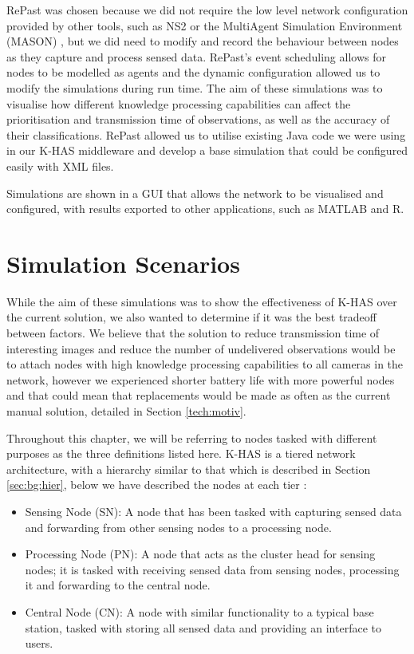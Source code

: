 RePast was chosen because we did not require the low level network configuration provided by other tools, such as NS2 \cite{mccanne1997network} or the MultiAgent Simulation Environment (MASON) \cite{mason}, but we did need to modify and record the behaviour between nodes as they capture and process sensed data. RePast's event scheduling allows for nodes to be modelled as agents and the dynamic configuration allowed us to modify the simulations during run time. The aim of these simulations was to visualise how different knowledge processing capabilities can affect the prioritisation and transmission time of observations, as well as the accuracy of their classifications. RePast allowed us to utilise existing Java code we were using in our K-HAS middleware and develop a base simulation that could be configured easily with XML files.

Simulations are shown in a GUI that allows the network to be visualised and configured, with results exported to other applications, such as MATLAB and R.

\section{Simulation Scenarios}\label{sim:scen}
While the aim of these simulations was to show the effectiveness of K-HAS over the current solution, we also wanted to determine if it was the best tradeoff between factors. We believe that the solution to reduce transmission time of interesting images and reduce the number of undelivered observations would be to attach nodes with high knowledge processing capabilities to all cameras in the network, however we experienced shorter battery life with more powerful nodes and that could mean that replacements would be made as often as the current manual solution, detailed in Section \ref{tech:motiv}.

Throughout this chapter, we will be referring to nodes tasked with different purposes as the three definitions listed here. K-HAS is a tiered network architecture, with a hierarchy similar to that which is described in Section \ref{sec:bg:hier}, below we have described the nodes at each tier :
	\begin{itemize}
		\item Sensing Node (SN): A node that has been tasked with capturing sensed data and forwarding from other sensing nodes to a processing node.
		\item Processing Node (PN): A node that acts as the cluster head for sensing nodes; it is tasked with receiving sensed data from sensing nodes, processing it and forwarding to the central node.
		\item Central Node (CN): A node with similar functionality to a typical base station, tasked with storing all sensed data and providing an interface to users.
	\end{itemize}

